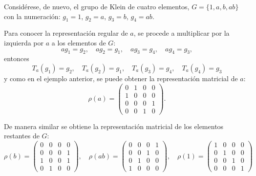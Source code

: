 \begin{ejemplo}
Considérese, de nuevo, el grupo de Klein de cuatro elementos, $G = \{ 1, a, b, ab\}$ con la numeración: $g_1 = 1$, $g_2 = a$, $g_3 = b$, $g_4 = ab$.

Para conocer la representación regular de $a$, se procede a multiplicar por  la izquierda por $a$ a los elementos de $G$:
\begin{equation*} ag_1 = g_2, \quad ag_2 = g_1, \quad ag_3 = g_4, \quad ag_4 = g_3, \end{equation*} entonces 
\begin{equation*} T_a(g_1) = g_2 , \quad T_a(g_2) = g_1, \quad T_a(g_3) = g_4, \quad T_a(g_4) = g_3 \end{equation*} \nopagebreak[0] y como en el ejemplo anterior, se puede obtener la representación matricial de $a$:
\begin{equation*}  \rho(a) = \begin{pmatrix}
0 & 1 & 0 & 0 \\
1 & 0 & 0 & 0 \\
0 & 0 & 0 & 1 \\
0 & 0 & 1 & 0
\end{pmatrix} .\end{equation*}

De manera similar se obtiene la representación matricial de los elementos restantes de $G$:
\begin{equation*} \rho(b) = \begin{pmatrix}
0 & 0 & 0 & 0\\
0 & 0 & 0 & 1\\
1 & 0 & 0 & 1\\
0 & 1 & 0 & 0
\end{pmatrix}, \quad \rho(ab) = \begin{pmatrix}
0 & 0 & 0 & 1\\
0 & 0 & 1 & 0\\
0 & 1 & 0 & 0\\
1 & 0 & 0 & 0
\end{pmatrix} , \quad \rho(1) = \begin{pmatrix}
1 & 0 & 0 & 0\\
0 & 1 & 0 & 0 \\
0 & 0 & 1 & 0\\
0 & 0 & 0 & 1
\end{pmatrix} \end{equation*}

\end{ejemplo}

